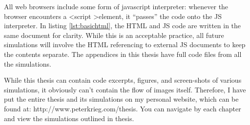 All web browsers include some form of javascript interpreter: whenever the browser encounters a \textless script \textgreater element, it     ``passes''  the code onto the JS interpreter.  In listing \ref{lst:basichtml}, the HTML and JS code are written in the same document for clarity.  While this is an acceptable practice, all future simulations will involve the HTML referencing to external JS documents to keep the contents separate.  The appendices in this thesis have full code files from all the simulations.  

While this thesis can contain code excerpts, figures, and screen-shots of various simulations, it obviously can't contain the flow of images itself.  Therefore, I have put the entire thesis and its simulations on my personal website, which can be found at:  http://www.peterkrieg.com/thesis.  You can navigate by each chapter and view the simulations outlined in thesis. 




